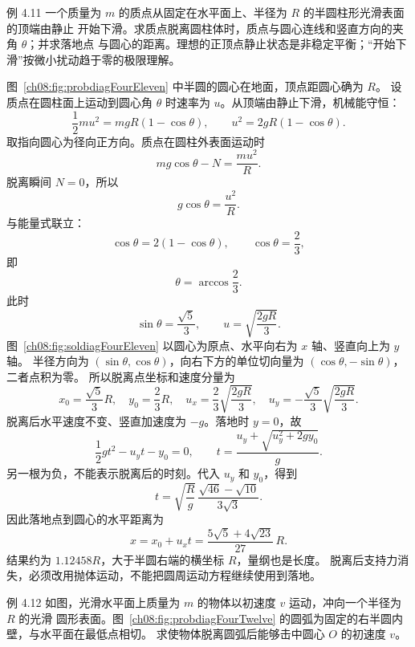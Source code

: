 \Needspace{0.34\textheight}
\begin{origexamplebox}{例 4.11}
一个质量为 $m$ 的质点从固定在水平面上、半径为 $R$ 的半圆柱形光滑表面的顶端由静止
开始下滑。求质点脱离圆柱体时，质点与圆心连线和竖直方向的夹角 $\theta$；并求落地点
与圆心的距离。理想的正顶点静止状态是非稳定平衡；“开始下滑”按微小扰动趋于零的极限理解。
\probdiagFourEleven
\end{origexamplebox}

\begin{xesolution}
图~\ref{ch08:fig:probdiagFourEleven} 中半圆的圆心在地面，顶点距圆心确为 $R$。
设质点在圆柱面上运动到圆心角 $\theta$ 时速率为 $u$。从顶端由静止下滑，机械能守恒：
\[
 \frac12mu^2=mgR(1-\cos\theta),
 \qquad
 u^2=2gR(1-\cos\theta).
\]
取指向圆心为径向正方向。质点在圆柱外表面运动时
\[
 mg\cos\theta-N=\frac{mu^2}{R}.
\]
脱离瞬间 $N=0$，所以
\[
 g\cos\theta=\frac{u^2}{R}.
\]
与能量式联立：
\[
 \cos\theta=2(1-\cos\theta),
 \qquad
 \boxed{\cos\theta=\frac23},
\]
即
\[
 \boxed{\theta=\arccos\frac23}.
\]
此时
\[
 \sin\theta=\frac{\sqrt5}{3},
 \qquad
 u=\sqrt{\frac{2gR}{3}}.
\]
\soldiagFourEleven
图~\ref{ch08:fig:soldiagFourEleven} 以圆心为原点、水平向右为 $x$ 轴、竖直向上为 $y$ 轴。
半径方向为 $(\sin\theta,\cos\theta)$，向右下方的单位切向量为 $(\cos\theta,-\sin\theta)$，二者点积为零。
所以脱离点坐标和速度分量为
\[
 x_0=\frac{\sqrt5}{3}R,\quad
 y_0=\frac23R,\quad
 u_x=\frac23\sqrt{\frac{2gR}{3}},\quad
 u_y=-\frac{\sqrt5}{3}\sqrt{\frac{2gR}{3}}.
\]
脱离后水平速度不变、竖直加速度为 $-g$。落地时 $y=0$，故
\[
 \frac12gt^2-u_yt-y_0=0,\qquad t=\frac{u_y+\sqrt{u_y^2+2gy_0}}{g}.
\]
另一根为负，不能表示脱离后的时刻。代入 $u_y$ 和 $y_0$，得到
\[
 t=\sqrt{\frac{R}{g}}\,
 \frac{\sqrt{46}-\sqrt{10}}{3\sqrt3}.
\]
因此落地点到圆心的水平距离为
\[
 \boxed{
 x=x_0+u_xt
 =\frac{5\sqrt5+4\sqrt{23}}{27}\,R}.
\]
结果约为 $1.12458R$，大于半圆右端的横坐标 $R$，量纲也是长度。
脱离后支持力消失，必须改用抛体运动，不能把圆周运动方程继续使用到落地。
\end{xesolution}

\Needspace{0.33\textheight}
\begin{origexamplebox}{例 4.12}
如图，光滑水平面上质量为 $m$ 的物体以初速度 $v$ 运动，冲向一个半径为 $R$ 的光滑
圆形表面。图~\ref{ch08:fig:probdiagFourTwelve} 的圆弧为固定的右半圆内壁，与水平面在最低点相切。
求使物体脱离圆弧后能够击中圆心 $O$ 的初速度 $v$。
\probdiagFourTwelve
\end{origexamplebox}

